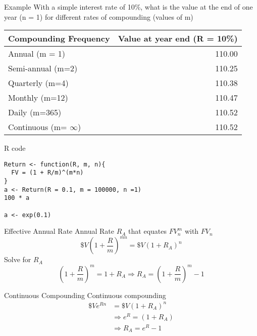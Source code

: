 \documentclass[14pt,xcolor=pdftex,dvipsnames,table]{beamer}
\begin{document}
\begin{frame}{Example}
With a simple interest rate of 10\%, what is the value at the end of one year (n = 1) for different rates of compounding (values of m)  
\begin{center}
 \begin{tabular}{l | r}
Compounding Frequency & Value at year end (R = 10\%)\\
\hline
Annual (m = 1) & 110.00\\
Semi-annual (m=2) & 110.25\\
Quarterly (m=4) & 110.38\\
Monthly (m=12) & 110.47\\
Daily (m=365) & 110.52\\
Continuous (m= $\infty$) & 110.52\\
\hline
\end{tabular}
\end{center}
\end{frame} 

\begin{frame}[fragile]{R code}
\begin{verbatim}
Return <- function(R, m, n){
  FV = (1 + R/m)^(m*n)
}
a <- Return(R = 0.1, m = 100000, n =1)
100 * a

a <- exp(0.1)
\end{verbatim}
\end{frame}

\begin{frame}{Effective Annual Rate}
Annual Rate $R_A$ that equates $FV_n^m$ with $FV_n$
\begin{equation}
\$V \left(1 + \frac{R}{m} \right)^{mn} = \$V(1+R_A)^n
\end{equation}
Solve for $R_A$
\begin{equation}
\left(1+\frac{R}{m}\right)^m = 1 + R_A \Rightarrow R_A = \left(1+\frac{R}{m}\right)^m -1
\end{equation}
\end{frame}

\begin{frame}{Continuous Compounding}
Continuous compounding
\begin{align*}
\$Ve^{Rn}&=\$V(1+R_A)^n\\
&\Rightarrow e^R=(1+R_A)\\
&\Rightarrow R_A = e^R - 1
\end{align*}
\end{frame}
\end{document}
